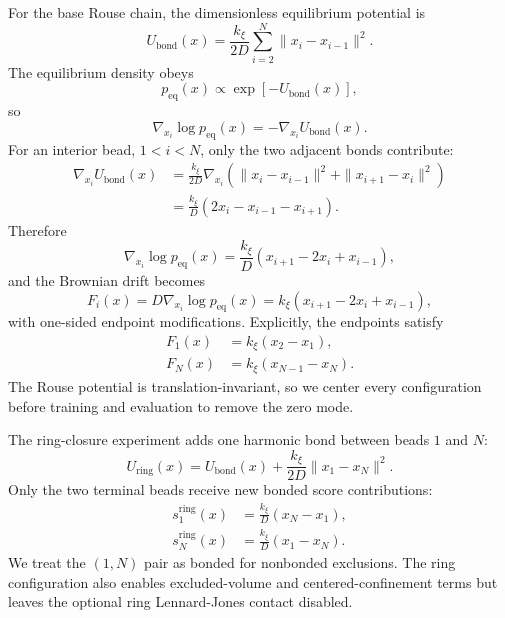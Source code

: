 \documentclass[reprint,amsmath,amssymb,aps,pra,10pt]{revtex4-2}
\begin{document}
For the base Rouse chain, the dimensionless equilibrium potential is
\begin{equation}
    U_{\mathrm{bond}}(x)
    =
    \frac{k_\xi}{2D}
    \sum_{i=2}^{N}
    \|x_i-x_{i-1}\|^2.
\end{equation}
The equilibrium density obeys
\begin{equation}
    p_{\mathrm{eq}}(x)
    \propto
    \exp\left[-U_{\mathrm{bond}}(x)\right],
\end{equation}
so
\begin{equation}
    \nabla_{x_i}\log p_{\mathrm{eq}}(x)
    =
    -
    \nabla_{x_i}U_{\mathrm{bond}}(x).
\end{equation}
For an interior bead, $1<i<N$, only the two adjacent bonds contribute:
\begin{align}
    \nabla_{x_i}U_{\mathrm{bond}}(x)
    &=
    \frac{k_\xi}{2D}
    \nabla_{x_i}
    \left(
        \|x_i-x_{i-1}\|^2
        +
        \|x_{i+1}-x_i\|^2
    \right)
    \nonumber \\
    &=
    \frac{k_\xi}{D}
    \left(
        2x_i-x_{i-1}-x_{i+1}
    \right).
\end{align}
Therefore
\begin{equation}
    \nabla_{x_i}\log p_{\mathrm{eq}}(x)
    =
    \frac{k_\xi}{D}
    \left(
        x_{i+1}-2x_i+x_{i-1}
    \right),
\end{equation}
and the Brownian drift becomes
\begin{equation}
    F_i(x)
    =
    D\nabla_{x_i}\log p_{\mathrm{eq}}(x)
    =
    k_\xi
    \left(
        x_{i+1}-2x_i+x_{i-1}
    \right),
\end{equation}
with one-sided endpoint modifications.
Explicitly, the endpoints satisfy
\begin{align}
    F_1(x)
    &=
    k_\xi(x_2-x_1),
    \\
    F_N(x)
    &=
    k_\xi(x_{N-1}-x_N).
\end{align}
The Rouse potential is translation-invariant, so we center every configuration before training and evaluation to remove the zero mode.

The ring-closure experiment adds one harmonic bond between beads $1$ and $N$:
\begin{equation}
    U_{\mathrm{ring}}(x)
    =
    U_{\mathrm{bond}}(x)
    +
    \frac{k_\xi}{2D}
    \|x_1-x_N\|^2.
\end{equation}
Only the two terminal beads receive new bonded score contributions:
\begin{align}
    s^{\mathrm{ring}}_1(x)
    &=
    \frac{k_\xi}{D}
    (x_N-x_1),
    \\
    s^{\mathrm{ring}}_N(x)
    &=
    \frac{k_\xi}{D}
    (x_1-x_N).
\end{align}
We treat the $(1,N)$ pair as bonded for nonbonded exclusions.
The ring configuration also enables excluded-volume and centered-confinement terms but leaves the optional ring Lennard-Jones contact disabled.
\end{document}
